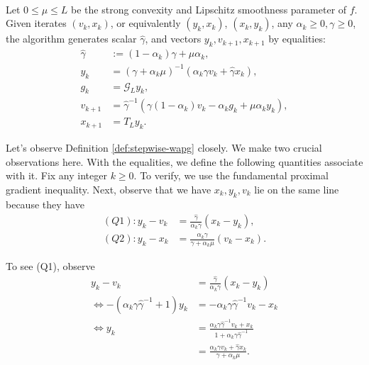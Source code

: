 \documentclass[12pt]{article}
\begin{document}
    
    \begin{definition}\label{def:stepwise-wapg}\;\\
        Let $0 \le \mu \le L$ be the strong convexity and Lipschitz smoothness parameter of $f$. 
        Given iterates $(v_k, x_k)$, or equivalently $(y_k, x_k)$, $(x_k, y_k)$, any $\alpha_k \ge 0, \gamma \ge 0$, the algorithm generates scalar $\hat \gamma$, and vectors $y_k, v_{k + 1}, x_{k + 1}$ by equalities: 
        \begin{align*}
            \hat \gamma &:= (1 - \alpha_k)\gamma + \mu \alpha_k, 
            \\
            y_k &= 
            (\gamma + \alpha_k \mu)^{-1}(\alpha_k \gamma v_k + \hat\gamma x_k), 
            \\
            g_k &= \mathcal G_L y_k, 
            \\
            v_{k + 1} &= \hat\gamma^{-1}
            (\gamma(1 - \alpha_k) v_k - \alpha_k g_k + \mu \alpha_k y_k), 
            \\
            x_{k + 1} &= T_L y_k. 
        \end{align*}
    \end{definition}
    \begin{observation}\label{obs:stepwise-wapg}
        Let's observe Definition \ref{def:stepwise-wapg} closely. 
        We make two crucial observations here. 
        With the equalities, we define the following quantities associate with it. 
        Fix any integer $k \ge 0$. 
        To verify, we use the fundamental proximal gradient inequality. 
        Next, observe that we have $x_k, y_k, v_k$ lie on the same line because they have 
        \begin{align*}
            (Q1): 
            y_k - v_k &= 
            \frac{\hat \gamma}{\alpha_k \gamma}(x_k - y_k),
            \\
            (Q2): 
            y_k - x_k &= 
            \frac{\alpha_k \gamma}{\gamma + \alpha_k \mu}(v_k - x_k). 
        \end{align*}
    \end{observation}
        To see (Q1), observe 
        \begin{align*}
            y_k - v_k &= 
            \frac{\hat \gamma}{\alpha_k \gamma}(x_k - y_k)
            \\
            \iff 
            -(\alpha_k \gamma\hat \gamma^{-1} + 1)y_k
            &= 
            - \alpha_k \gamma \hat \gamma^{-1}v_k - x_k
            \\
            \iff 
            y_k &= 
            \frac{
                \alpha_k \gamma \hat \gamma^{-1}v_k + x_k
            }{1 + \alpha_k \gamma \hat \gamma^{-1}}
            \\
            &=  
            \frac{\alpha_k \gamma v_k + \hat \gamma x_k}{\gamma + \alpha_k \mu}.
        \end{align*}
\end{document}
